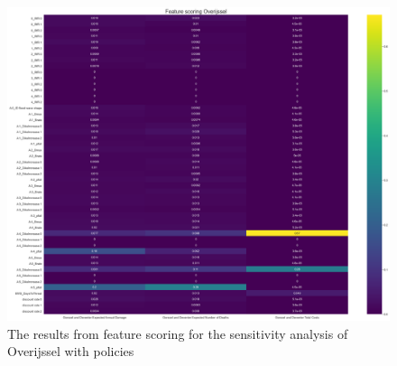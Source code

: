 \begin{figure}[h!]
    \centering
    \includegraphics[width=\textwidth]{report/figures/results/Feature_scoring_Overijssel_100scen.png}
    \caption{The results from feature scoring for the sensitivity analysis of Overijssel with policies}
    \label{fig:feat-scor-o}
\end{figure}

